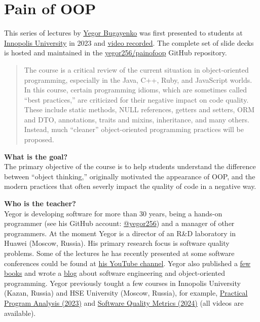 \documentclass[nobrand,anonymous,nodate,nosecurity]{huawei}
\begin{document}


\section*{Pain of OOP}

This series of lectures by \href{https://www.yegor256.com}{Yegor Bugayenko}
was first presented to students at
\href{https://innopolis.university/en/}{Innopolis University} in 2023
and \href{https://www.youtube.com/playlist?list=PLaIsQH4uc08ytf8POIIAkkR4ZsRq8DFiV}{video recorded}.
The complete set of slide decks is hosted and maintained in the
\href{https://github.com/yegor256/painofoop}{yegor256/painofoop}
GitHub repository.

\begin{abstract}
The course is a critical review of the current situation in object-oriented programming,
especially in the Java, C++, Ruby, and JavaScript worlds. In this course, certain programming
idioms, which are sometimes called ``best practices,'' are criticized for their
negative impact on code quality. These include static methods, NULL references, getters
and setters, ORM and DTO, annotations, traits and mixins, inheritance, and many others.
Instead, much ``cleaner'' object-oriented programming practices will be proposed.
\end{abstract}


\textbf{What is the goal?}\\
The primary objective of the course is to help students understand the
difference between ``object thinking,'' originally motivated the
appearance of OOP, and the modern practices that often
severly impact the quality of code in a negative way.

\textbf{Who is the teacher?}\\
Yegor is developing software for more than 30 years, being a hands-on programmer
(see his GitHub account: \href{https://github.com/yegor256}{@yegor256})
and a manager of other programmers. At the moment Yegor is a director
of an R\&D laboratory in Huawei (Moscow, Russia). His primary research focus is
software quality problems. Some of the lectures he has recently presented
at some software conferences could be found at
\href{https://www.youtube.com/channel/UCr9qCdqXLm2SU0BIs6d_68Q}{his YouTube channel}.
Yegor also published a \href{https://www.yegor256.com/books.html}{few books}
and wrote a \href{https://www.yegor256.com/contents.html}{blog} about software engineering
and object-oriented programming.
Yegor previously tought a few courses in
Innopolis University (Kazan, Russia)
and HSE University (Moscow, Russia),
for example,
\href{https://github.com/yegor256/ppa}{Practical Program Analysis (2023)}
and
\href{https://github.com/yegor256/sqm}{Software Quality Metrics (2024)}
(all videos are available).
\end{document}
